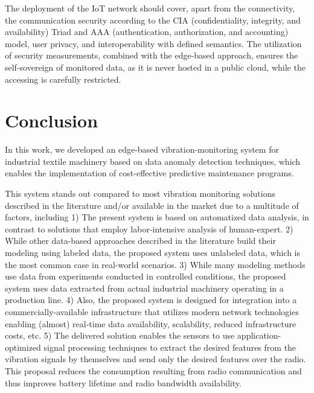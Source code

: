 \documentclass[conference]{IEEEtran}
\begin{document}
The deployment of the IoT network should cover, apart from the connectivity, the communication security according to the CIA (confidentiality, integrity, and availability) Triad and AAA (authentication, authorization, and accounting) model, user privacy, and interoperability with defined semantics. The utilization of security measurements, combined with the edge-based approach, ensures the self-sovereign of monitored data, as it is never hosted in a public cloud, while the accessing is carefully restricted.


\section{Conclusion}
\label{sec_conclusion}

In this work, we developed an edge-based vibration-monitoring system for industrial textile machinery based on data anomaly detection techniques, which enables the implementation of cost-effective predictive maintenance programs.

This system stands out compared to most vibration monitoring solutions described in the literature and/or available in the market due to a multitude of factors, including 1) The present system is based on automatized data analysis, in contrast to solutions that employ labor-intensive analysis of human-expert. 2) While other data-based approaches described in the literature build their modeling using labeled data, the proposed system uses unlabeled data, which is the most common case in real-world scenarios. 3) While many modeling methods use data from experiments conducted in controlled conditions, the proposed system uses data extracted from actual industrial machinery operating in a production line. 4) Also, the proposed system is designed for integration into a commercially-available infrastructure that utilizes modern network technologies enabling (almost) real-time data availability, scalability, reduced infrastructure costs, etc. 5) The delivered solution enables the sensors to use application-optimized signal processing techniques to extract the desired features from the vibration signals by themselves and send only the desired features over the radio. This proposal reduces the consumption resulting from radio communication and thus improves battery lifetime and radio bandwidth availability.
\end{document}

